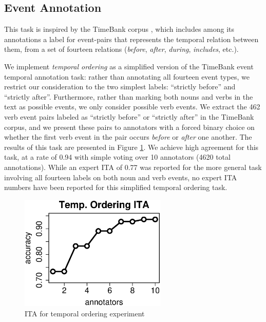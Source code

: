 \documentclass[11pt]{article}
\begin{document}
\subsection{Event Annotation}

This task is inspired by the TimeBank corpus \cite{TimeBank}, which includes among its annotations
a label for event-pairs that represents the temporal relation between them, from a set of fourteen relations ({\em before}, {\em after}, {\em during}, {\em includes}, etc.).


We implement \textit{temporal ordering} as a simplified version of the TimeBank event temporal annotation task: rather than annotating all fourteen event types, we restrict our consideration to the two simplest labels:  ``strictly before'' and ``strictly after''.  Furthermore, rather than marking both nouns and verbs in the text as possible events, we only consider possible verb events.  We extract the 462 verb event pairs labeled as ``strictly before'' or ``strictly after'' in the TimeBank corpus, and we present these  pairs to annotators with a forced binary choice on whether the first verb event in the pair occurs \textit{before} or \textit{after} one another.  The results of this task are presented in Figure \ref{tempITA}.  We achieve high agreement for this task, at a rate of 0.94 with simple voting over 10 annotators (4620 total annotations). While an expert ITA of 0.77 was reported for the more general task involving all fourteen labels on both noun and verb events, no expert ITA numbers have been reported for this simplified temporal ordering task.
\begin{figure}[ht]
\centering
\includegraphics[width=7cm]{figures/temp.eps}
\caption{ITA for temporal ordering experiment } \label{tempITA}
\end{figure}
\end{document}
